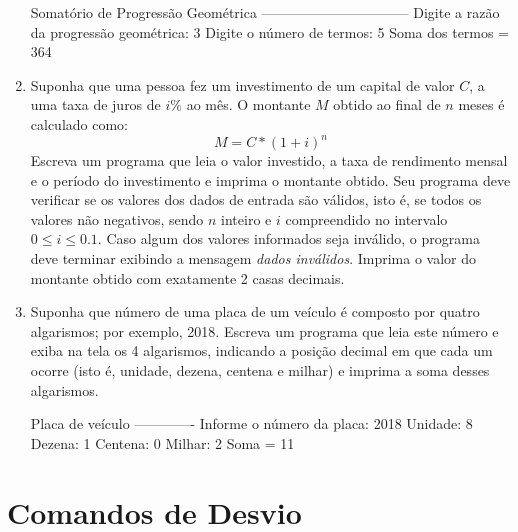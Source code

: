 \documentclass[11pt,fleqn]{practice}
\begin{document}
\begin{enumerate}
  \begin{runexample}
Somatório de Progressão Geométrica
--------------------------------
Digite a razão da progressão geométrica: 3
Digite o número de termos: 5
Soma dos termos = 364
\end{runexample}

\item Suponha que uma pessoa fez um investimento de um capital de valor $C$, a uma taxa de juros de $i\%$ ao mês. O montante $M$ obtido ao final de $n$ meses é calculado como:
\[ M = C * (1 + i)^n \] 
Escreva um programa que leia o valor investido, a taxa de rendimento mensal e o período do investimento e imprima o montante obtido. Seu programa deve verificar se os valores dos dados de entrada são válidos, isto é, se todos os valores não negativos, sendo $n$ inteiro e $i$  compreendido no intervalo $0 \leq i \leq 0.1$. Caso algum dos valores informados seja inválido, o programa deve terminar exibindo a mensagem \emph{dados inválidos}. Imprima o valor do montante obtido com exatamente 2 casas decimais.


\item Suponha que número de uma placa de um veículo é composto por quatro algarismos; por exemplo, 2018. Escreva um programa que leia este número e exiba na tela os 4 algarismos, indicando a posição decimal em que cada um ocorre (isto é, unidade, dezena, centena e milhar) e imprima a soma desses algarismos.

  \begin{runexample}
Placa de veículo
-------------
Informe o número da placa: 2018
Unidade:  8
Dezena:   1
Centena:  0
Milhar:     2
Soma =  11
\end{runexample}

\end{enumerate}

\section{Comandos de Desvio}
\end{document}
